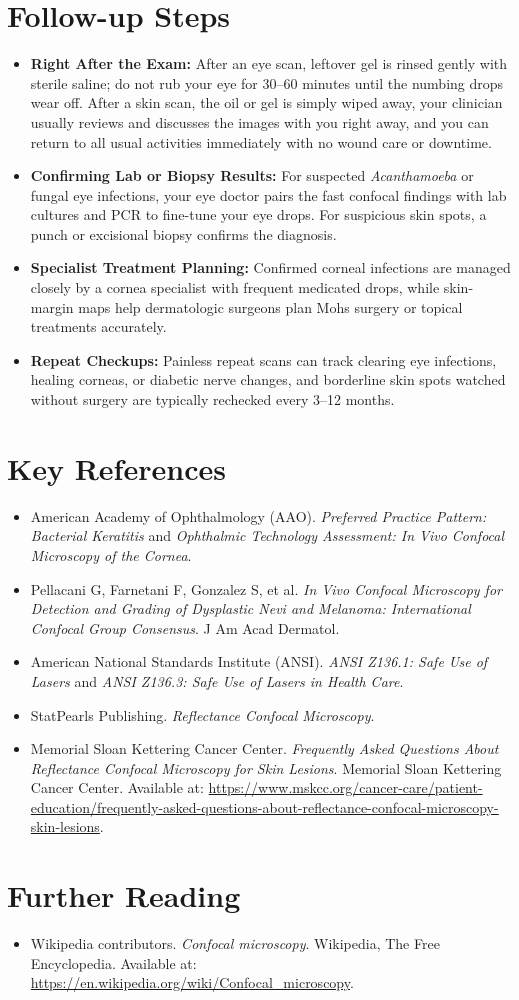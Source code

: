 \section{Follow-up Steps}
\begin{itemize}
    \item \textbf{Right After the Exam:} After an eye scan, leftover gel is rinsed gently with sterile saline; do not rub your eye for 30--60 minutes until the numbing drops wear off. After a skin scan, the oil or gel is simply wiped away, your clinician usually reviews and discusses the images with you right away, and you can return to all usual activities immediately with no wound care or downtime.
    \item \textbf{Confirming Lab or Biopsy Results:} For suspected \textit{Acanthamoeba} or fungal eye infections, your eye doctor pairs the fast confocal findings with lab cultures and PCR to fine-tune your eye drops. For suspicious skin spots, a punch or excisional biopsy confirms the diagnosis.
    \item \textbf{Specialist Treatment Planning:} Confirmed corneal infections are managed closely by a cornea specialist with frequent medicated drops, while skin-margin maps help dermatologic surgeons plan Mohs surgery or topical treatments accurately.
    \item \textbf{Repeat Checkups:} Painless repeat scans can track clearing eye infections, healing corneas, or diabetic nerve changes, and borderline skin spots watched without surgery are typically rechecked every 3--12 months.
\end{itemize}

\section{Key References}
\begin{itemize}
    \item American Academy of Ophthalmology (AAO). \textit{Preferred Practice Pattern: Bacterial Keratitis} and \textit{Ophthalmic Technology Assessment: In Vivo Confocal Microscopy of the Cornea}.
    \item Pellacani G, Farnetani F, Gonzalez S, et al. \textit{In Vivo Confocal Microscopy for Detection and Grading of Dysplastic Nevi and Melanoma: International Confocal Group Consensus}. J Am Acad Dermatol.
    \item American National Standards Institute (ANSI). \textit{ANSI Z136.1: Safe Use of Lasers} and \textit{ANSI Z136.3: Safe Use of Lasers in Health Care}.
    \item StatPearls Publishing. \textit{Reflectance Confocal Microscopy}.
    \item Memorial Sloan Kettering Cancer Center. \textit{Frequently Asked Questions About Reflectance Confocal Microscopy for Skin Lesions}. Memorial Sloan Kettering Cancer Center. Available at: \url{https://www.mskcc.org/cancer-care/patient-education/frequently-asked-questions-about-reflectance-confocal-microscopy-skin-lesions}.
\end{itemize}

\section{Further Reading}
\begin{itemize}
  \item Wikipedia contributors. \textit{Confocal microscopy}. Wikipedia, The Free Encyclopedia. Available at: \url{https://en.wikipedia.org/wiki/Confocal_microscopy}.
\end{itemize}
